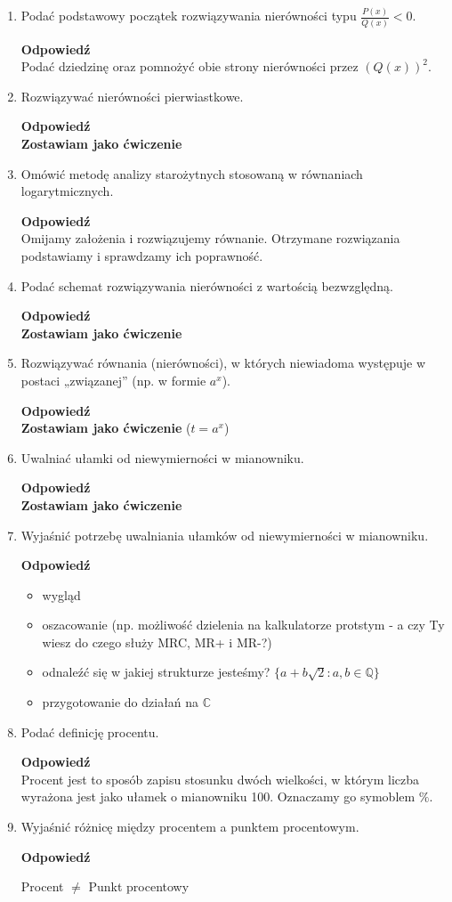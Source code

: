 \documentclass[12pt,a4paper]{article}
\theoremstyle{break}
\newcommand{\Odp}[1]{
		\begin{mdframed}[style=zadanie]
			\textbf{Odpowiedź}\\
			#1
		\end{mdframed}
	}
\begin{document}
\begin{enumerate}[1.]
	\item Podać podstawowy początek rozwiązywania nierówności typu $\frac{P(x)}{Q(x)} < 0$.
	\Odp{
		Podać dziedzinę oraz pomnożyć obie strony nierówności przez $(Q(x))^2$.
	}
	
	\item Rozwiązywać nierówności pierwiastkowe.
	\Odp{
		\textbf{Zostawiam jako ćwiczenie}
	}
	
	\item Omówić metodę analizy starożytnych stosowaną w równaniach logarytmicznych.
	\Odp{
		Omijamy założenia i rozwiązujemy równanie. Otrzymane rozwiązania podstawiamy i sprawdzamy ich poprawność.
	}
	
	\item Podać schemat rozwiązywania nierówności z wartością bezwzględną.
	\Odp{
		\textbf{Zostawiam jako ćwiczenie}
	}

	\item Rozwiązywać równania (nierówności), w których niewiadoma występuje w postaci	„związanej” (np. w formie $a^x$).
	\Odp{
		\textbf{Zostawiam jako ćwiczenie} ($t=a^x$)
	}
	
	\item Uwalniać ułamki od niewymierności w mianowniku.
	\Odp{
		\textbf{Zostawiam jako ćwiczenie}
	}
	
	\item Wyjaśnić potrzebę uwalniania ułamków od niewymierności w mianowniku.
	\Odp{
		\begin{itemize}
			\item wygląd
			\item oszacowanie (np. możliwość dzielenia na kalkulatorze protstym - a czy Ty wiesz do czego służy MRC, MR+ i MR-?)
			\item odnaleźć się w jakiej strukturze jesteśmy? $\{a+b\sqrt{2} : a,b\in\mathbb{Q}\}$
			\item przygotowanie do działań na $\mathbb{C}$
		\end{itemize}
	}
	\newpage
	\item Podać definicję procentu.
	\Odp{
		Procent jest to sposób zapisu stosunku dwóch wielkości, w którym liczba wyrażona jest jako ułamek o mianowniku 100. Oznaczamy go symoblem $\%$.
	}
	
	\item Wyjaśnić różnicę między procentem a punktem procentowym.
	\Odp{
		\begin{center}
			Procent $\neq$ Punkt procentowy
		\end{center}
		
}
\end{enumerate}
\end{document}
